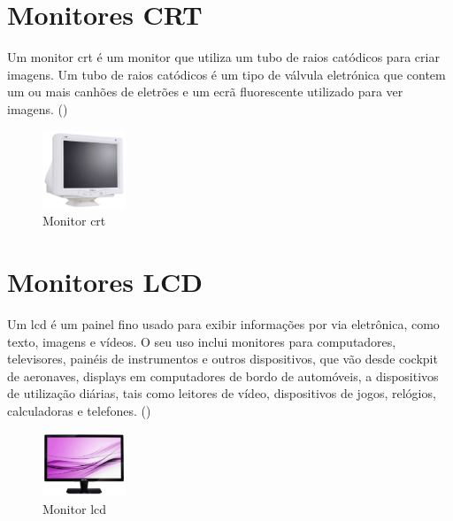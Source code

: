 \documentclass[a4paper]{report}
\begin{document}
\section{Monitores CRT}
Um monitor \ac{crt} é um monitor que utiliza um tubo de raios catódicos para criar imagens.
Um tubo de raios catódicos é um tipo de válvula eletrónica que contem um ou mais canhões de eletrões e um ecrã fluorescente utilizado para ver imagens. (\cite{crt})
\begin{center}
\begin{figure}[h]
\center
\includegraphics[width=2.5cm]{imagens/crt.jpeg}
\caption{Monitor \ac{crt}}
\end{figure}
\end{center}

\section{Monitores LCD}

Um \ac{lcd} é um painel fino usado para exibir informações por via eletrônica, como texto, imagens e vídeos. O seu uso inclui monitores para computadores, televisores, painéis de instrumentos e outros dispositivos, que vão desde cockpit de aeronaves, displays em computadores de bordo de automóveis, a dispositivos de utilização diárias, tais como leitores de vídeo, dispositivos de jogos, relógios, calculadoras e telefones. (\cite{lcd})
\begin{center}
\begin{figure}[h]
\center
\includegraphics[width=2.5cm]{imagens/lcd.jpeg}
\caption{Monitor \ac{lcd}}
\end{figure}
\end{center}
\end{document}
